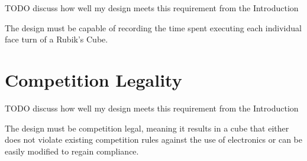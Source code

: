 TODO discuss how well my design meets this requirement from the Introduction

The design must be capable of recording the time spent executing each individual face turn of a Rubik's Cube.


\section{Competition Legality}

TODO discuss how well my design meets this requirement from the Introduction

The design must be competition legal, meaning it results in a cube that either does not violate existing competition rules against the use of electronics or can be easily modified to regain compliance.

